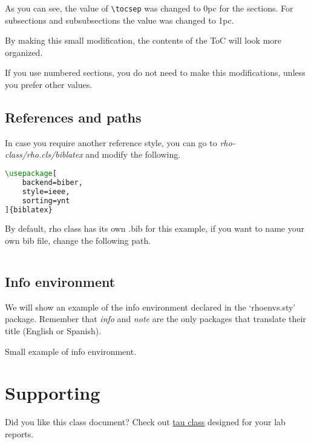 \documentclass[9pt,a4paper,twoside]{rho-class/rho}
\begin{document}
        As you can see, the value of \verb|\tocsep| was changed to 0pc for the sections. For subsections and subsubsections the value was changed to 1pc.

        By making this small modification, the contents of the ToC will look more organized.

        If you use numbered sections, you do not need to make this modifications, unless you prefer other values.

    \subsection{References and paths}

        In case you require another reference style, you can go to \textit{rho-class/rho.cls/biblatex} and modify the following. 

\nolinenumbers
\begin{lstlisting}[language=TeX, caption=Reference code.]
\usepackage[
    backend=biber,
    style=ieee,
    sorting=ynt
]{biblatex}
\end{lstlisting}

        By default, rho class has its own .bib for this example, if you want to name your own bib file, change the following path.

\nolinenumbers
\begin{lstlisting}[language=TeX]

\end{lstlisting}

    \subsection{Info environment}

        We will show an example of the info environment declared in the ‘rhoenvs.sty’ package. Remember that \textit{info} and \textit{note} are the only packages that translate their title (English or Spanish).

        \begin{info}
            Small example of info environment.
        \end{info}

\section{Supporting}

    Did you like this class document? Check out \href{https://www.overleaf.com/latex/templates/tau-class-lab-report-template/chhshmhxstsq}{tau class} designed for your lab reports.
\end{document}
